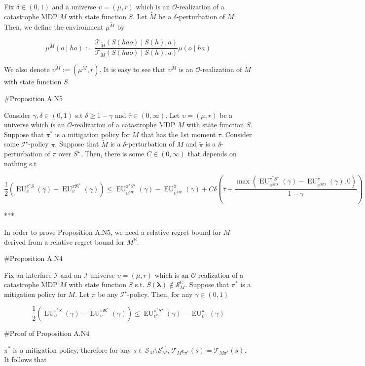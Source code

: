 \documentclass[a4paper]{article}
\newcommand{\AP}[1]{\left(#1\right)}
\newcommand{\Estr}{\boldsymbol{\lambda}}
\newcommand{\Ob}{\mathcal{O}}
\newcommand{\St}{\mathcal{S}}
\newcommand{\T}{\mathcal{T}}
\newcommand{\In}{\mathcal{I}}
\newcommand{\RMC}{\mathrm{C}}
\newcommand{\RMD}{\mathrm{D}}
\newcommand{\RME}{\mathrm{E}}
\newcommand{\SC}{\St^{\RMC}}
\newcommand{\ME}{M^{\RME}}
\newcommand{\EU}{\operatorname{EU}}
\begin{document}
Fix $\delta\in(0,1)$ and a universe $\upsilon=(\mu,r)$ which is an $\Ob$-realization of a catastrophe MDP $M$ with state function $S$. Let $\tilde{M}$ be a $\delta$-perturbation of $M$. Then, we define the environment $\mu^{\tilde{M}}$ by

$$\mu^{\tilde{M}}(o \mid ha) := \frac{\T_{\tilde{M}}\AP{S(hao) \mid S(h),a}}{\T_{M}\AP{S(hao) \mid S(h),a}}\mu(o \mid ha)$$

We also denote $\upsilon^{\tilde{M}}:=\AP{\mu^{\tilde{M}},r}$. It is easy to see that $\upsilon^{\tilde{M}}$ is an $\Ob$-realization of $\tilde{M}$ with state function $S$.

\#Proposition A.N5

Consider $\gamma,\delta\in(0,1)$ s.t $\delta \geq 1 - \gamma$ and $\bar{\tau}\in(0,\infty)$. Let $\upsilon=(\mu,r)$ be a universe which is an $\Ob$-realization of a catastrophe MDP $M$ with state function $S$. Suppose that $\pi^*$ is a mitigation policy for $M$ that has the 1st moment $\bar{\tau}$. Consider some $\In^\star$-policy $\pi$. Suppose that $\tilde{M}$ is a $\delta$-perturbation of $M$ and $\tilde{\pi}$ is a $\delta$-perturbation of $\pi$ over $S^\star$. Then, there is some $C\in(0,\infty)$ that depends on nothing s.t

$$\frac{1}{2}\AP{\EU_{\upsilon}^{\pi^* S}(\gamma)-\EU_{\upsilon}^{\pi\Re^*}(\gamma)} \leq \EU_{\upsilon^{\tilde{M}\RME}}^{\pi^* S^\star}(\gamma)-\EU_{\upsilon^{\tilde{M}\RME}}^{\tilde{\pi}}(\gamma) + C\delta\AP{\bar{\tau}+\frac{\max\AP{\EU_{\upsilon^{\tilde{M}\RMD}}^{\pi^* S^\star}(\gamma)-\EU_{\upsilon^{\tilde{M}\RMD}}^{\tilde{\pi}}(\gamma),0}}{1-\gamma}}$$

***

In order to prove Proposition A.N5, we need a relative regret bound for $M$ derived from a relative regret bound for $\ME$.

\#Proposition A.N4

Fix an interface $\In$ and an $\In$-universe $\upsilon=(\mu,r)$ which is an $\Ob$-realization of a catastrophe MDP $M$ with state function $S$ s.t. $S(\Estr)\not\in\SC_M$. Suppose that $\pi^*$ is a mitigation policy for $M$. Let $\pi$ be any $\In^\star$-policy. Then, for any $\gamma\in(0,1)$

$$\frac{1}{2}\AP{\EU_{\upsilon}^{\pi^* S}(\gamma)-\EU_{\upsilon}^{\pi\Re^*}(\gamma)} \leq \EU_{\upsilon^\RME}^{\pi^* S^\star}(\gamma)-\EU_{\upsilon^\RME}^{\pi}(\gamma)$$

\#Proof of Proposition A.N4

$\pi^*$ is a mitigation policy, therefore for any $s \in \St_M \setminus \SC_M$, $\T_{\ME\pi^*}(s)=\T_{M\pi^*}(s)$. It follows that 
\end{document}

